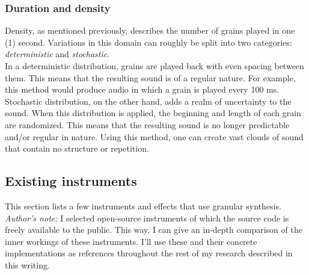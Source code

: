 \documentclass[10pt, twocolumn]{IEEEtran}
\begin{document}
\subsubsection{Duration and density}
Density, as mentioned previously, describes the number of grains played in one (1) second. Variations in this domain can roughly be split into two categories: \textit{deterministic} and \textit{stochastic}.\\
In a deterministic distribution, grains are played back with even spacing between them. This means that the resulting sound is of a regular nature. For example, this method would produce audio in which a grain is played every 100 ms. \\
Stochastic distribution, on the other hand, adds a realm of uncertainty to the sound. When this distribution is applied, the beginning and length of each grain are randomized. This means that the resulting sound is no longer predictable and/or regular in nature. Using this method, one can create vast clouds of sound that contain no structure or repetition.

\subsection{Existing instruments}
This section lists a few instruments and effects that use granular synthesis. \\
\textit{Author's note:} I selected open-source instruments of which the source code is freely available to the public. This way, I can give an in-depth comparison of the inner workings of these instruments. I'll use these and their concrete implementations as references throughout the rest of my research described in this writing.\\
\end{document}
